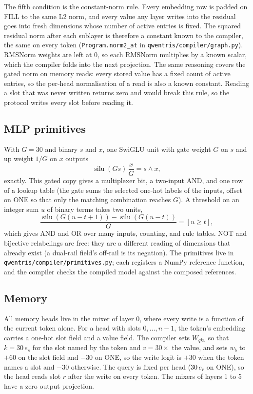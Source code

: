 \documentclass[11pt]{article}
\newcommand{\silu}{\operatorname{silu}}
\begin{document}
The fifth condition is the constant-norm rule. Every embedding row is padded on FILL to the same L2 norm, and every value any layer writes into the residual goes into fresh dimensions whose number of active entries is fixed. The squared residual norm after each sublayer is therefore a constant known to the compiler, the same on every token (\texttt{Program.norm2\_at} in \texttt{qwentris/compiler/graph.py}). RMSNorm weights are left at 0, so each RMSNorm multiplies by a known scalar, which the compiler folds into the next projection. The same reasoning covers the gated norm on memory reads: every stored value has a fixed count of active entries, so the per-head normalisation of a read is also a known constant. Reading a slot that was never written returns zero and would break this rule, so the protocol writes every slot before reading it.

\subsection{MLP primitives}

With $G = 30$ and binary $s$ and $x$, one SwiGLU unit with gate weight $G$ on $s$ and up weight $1/G$ on $x$ outputs
\begin{equation}
\silu(G s)\,\frac{x}{G} = s \wedge x ,
\end{equation}
exactly. This gated copy gives a multiplexer bit, a two-input AND, and one row of a lookup table (the gate sums the selected one-hot labels of the inputs, offset on ONE so that only the matching combination reaches $G$). A threshold on an integer sum $u$ of binary terms takes two units,
\begin{equation}
\frac{\silu(G(u - t + 1)) - \silu(G(u - t))}{G} = [u \ge t],
\end{equation}
which gives AND and OR over many inputs, counting, and rule tables. NOT and bijective relabelings are free: they are a different reading of dimensions that already exist (a dual-rail field's off-rail is its negation). The primitives live in \texttt{qwentris/compiler/primitives.py}; each registers a NumPy reference function, and the compiler checks the compiled model against the composed references.

\subsection{Memory}

All memory heads live in the mixer of layer 0, where every write is a function of the current token alone. For a head with slots $0, \dots, n-1$, the token's embedding carries a one-hot slot field and a value field. The compiler sets $W_{qkv}$ so that $k = 30\,e_s$ for the slot named by the token and $v = 30 \times$ the value, and sets $w_b$ to $+60$ on the slot field and $-30$ on ONE, so the write logit is $+30$ when the token names a slot and $-30$ otherwise. The query is fixed per head ($30\,e_r$ on ONE), so the head reads slot $r$ after the write on every token. The mixers of layers 1 to 5 have a zero output projection.
\end{document}
